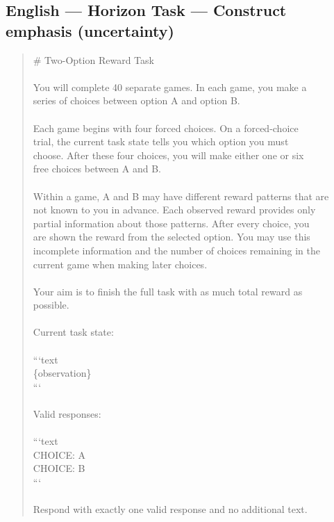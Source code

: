 \documentclass[logo,msc,inf]{infthesis}       %
\begin{document}
\subsection*{English --- Horizon Task --- Construct emphasis (uncertainty)}
\begin{quote}\ttfamily\footnotesize
\# Two-Option Reward Task \\
\\
You will complete 40 separate games. In each game, you make a \\
series of choices between option A and option B. \\
\\
Each game begins with four forced choices. On a forced-choice \\
trial, the current task state tells you which option you must \\
choose. After these four choices, you will make either one or six \\
free choices between A and B. \\
\\
Within a game, A and B may have different reward patterns that are \\
not known to you in advance. Each observed reward provides only \\
partial information about those patterns. After every choice, you \\
are shown the reward from the selected option. You may use this \\
incomplete information and the number of choices remaining in the \\
current game when making later choices. \\
\\
Your aim is to finish the full task with as much total reward as \\
possible. \\
\\
Current task state: \\
\\
```text \\
\{observation\} \\
``` \\
\\
Valid responses: \\
\\
```text \\
CHOICE: A \\
CHOICE: B \\
``` \\
\\
Respond with exactly one valid response and no additional text. \\
\end{quote}
\end{document}
